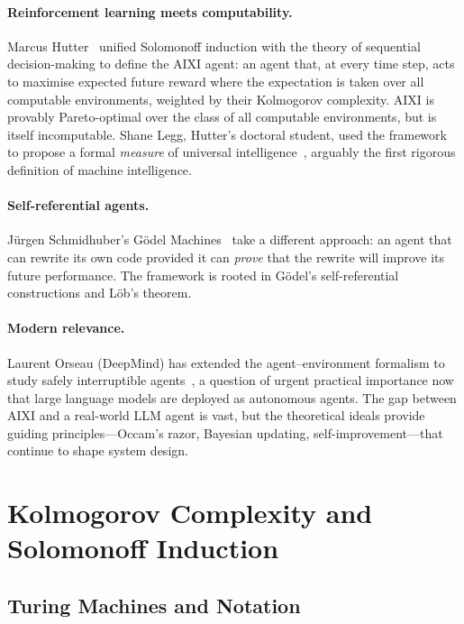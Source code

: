\documentclass[11pt,a4paper]{article}
\theoremstyle{definition}
\theoremstyle{remark}
\begin{document}
\paragraph{Reinforcement learning meets computability.}
Marcus Hutter~\cite{Hutter2005} unified Solomonoff induction with the
theory of sequential decision-making to define the AIXI agent: an agent that,
at every time step, acts to maximise expected future reward where the
expectation is taken over all computable environments, weighted by
their Kolmogorov complexity.  AIXI is provably Pareto-optimal over the
class of all computable environments, but is itself incomputable.
Shane Legg, Hutter's doctoral student, used the framework to propose a formal
\emph{measure} of universal intelligence~\cite{Legg2007}, arguably the first
rigorous definition of machine intelligence.

\paragraph{Self-referential agents.}
J\"urgen Schmidhuber's G\"odel Machines~\cite{Schmidhuber2007} take a different
approach: an agent that can rewrite its own code provided it can \emph{prove}
that the rewrite will improve its future performance.  The framework is rooted
in G\"odel's self-referential constructions and L\"ob's theorem.

\paragraph{Modern relevance.}
Laurent Orseau (DeepMind) has extended the agent--environment formalism to
study safely interruptible agents~\cite{Orseau2016}, a question of urgent
practical importance now that large language models are deployed as autonomous
agents.  The gap between AIXI and a real-world LLM agent is vast, but the
theoretical ideals provide guiding principles---Occam's razor, Bayesian
updating, self-improvement---that continue to shape system design.

\section{Kolmogorov Complexity and Solomonoff Induction}\label{sec:kolmogorov}

\subsection{Turing Machines and Notation}
\end{document}
